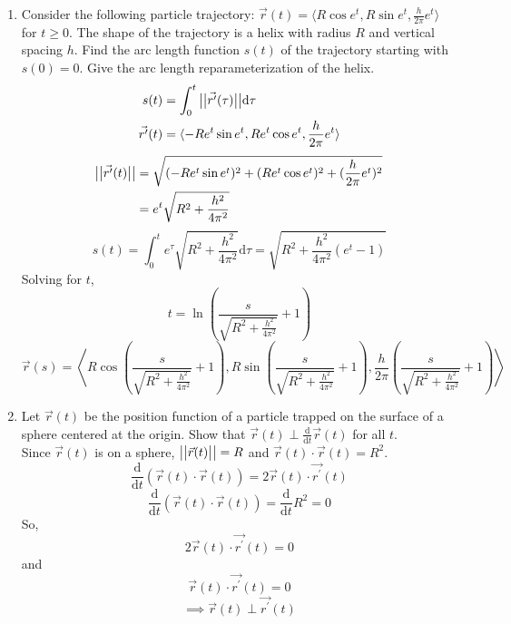 \begin{enumerate}
	\item Consider the following particle trajectory: $\vec{r}(t) = \langle R\cos{e^t}, R\sin{e^t}, \frac{h}{2\pi}e^t \rangle$ for $t \geq 0$. The shape of the trajectory is a helix with radius $R$ and vertical spacing $h$. Find the arc length function $s(t)$ of the trajectory starting with $s(0) = 0$. Give the arc length reparameterization of the helix.
	\begin{align*}
		s(t) &= \int_{0}^{t}{\big\lvert \big\lvert \vec{r^\prime}(\tau) \big\rvert \big\rvert\mathrm{d}\tau}\\
		\vec{r^\prime}(t) &= \langle -Re^{t}\sin{e^t}, Re^{t}\cos{e^t}, \frac{h}{2\pi}e^{t} \rangle
	\end{align*}
	\begin{align*}
		\big\lvert \big\lvert \vec{r^\prime}(t) \big\rvert \big\rvert &= \sqrt{(-Re^{t}\sin{e^t})^2 + (Re^{t}\cos{e^t})^2 + (\frac{h}{2\pi}e^t)^2} \\
		&= e^{t}\sqrt{R^2 + \frac{h^2}{4\pi^2}}
	\end{align*}
	\begin{equation*}
		s(t) = \int_{0}^{t}{e^{\tau}\sqrt{R^2 + \frac{h^2}{4\pi^2}}\mathrm{d}\tau} = \sqrt{R^2 + \frac{h^2}{4\pi^2}(e^{t} - 1)}
	\end{equation*}
	Solving for $t$,
	\begin{equation*}
		t = \ln{\left(\frac{s}{\sqrt{R^2 + \frac{h^2}{4\pi^2}}} + 1\right)}	
	\end{equation*}
	\begin{equation*}
		\vec{r}(s) = \left< R\cos{\left(\frac{s}{\sqrt{R^2 + \frac{h^2}{4\pi^2}}} + 1\right)}, R\sin{\left(\frac{s}{\sqrt{R^2 + \frac{h^2}{4\pi^2}}} + 1\right)}, \frac{h}{2\pi}\left(\frac{s}{\sqrt{R^2 +\frac{h^2}{4\pi^2}}} + 1\right) \right>
	\end{equation*}
	
	\item Let $\vec{r}(t)$ be the position function of a particle trapped on the surface of a sphere centered at the origin. Show that $\vec{r}(t)\perp\frac{\mathrm{d}}{\mathrm{d}t}\vec{r}(t)$ for all $t$.\\
	Since $\vec{r}(t)$ is on a sphere, $\big\lvert \big\lvert \vec{r}(t) \big\rvert \big\rvert = R$ and $\vec{r}(t) \cdot \vec{r}(t) = R^2$.
	\begin{equation*}
		\frac{\mathrm{d}}{\mathrm{d}t}(\vec{r}(t) \cdot \vec{r}(t)) = 2\vec{r}(t) \cdot \vec{r^\prime}(t)	
	\end{equation*}
	\begin{equation*}
		\frac{\mathrm{d}}{\mathrm{d}t}(\vec{r}(t) \cdot \vec{r}(t)) = \frac{\mathrm{d}}{\mathrm{d}t}R^2 = 0
	\end{equation*}
	So, 
	\begin{equation*}
		2\vec{r}(t) \cdot \vec{r^\prime}(t) = 0
	\end{equation*}
	and 
	\begin{equation*}
		\vec{r}(t) \cdot \vec{r^\prime}(t) = 0	
	\end{equation*}
	\begin{equation*}
		\implies \vec{r}(t)\perp\vec{r^\prime}(t)	
	\end{equation*}
\end{enumerate}